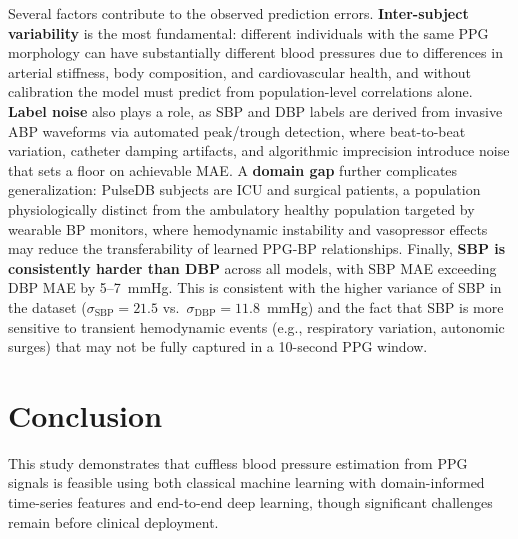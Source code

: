 \documentclass[11pt]{article}
\begin{document}
Several factors contribute to the observed prediction errors. \textbf{Inter-subject variability} is the most fundamental: different individuals with the same PPG morphology can have substantially different blood pressures due to differences in arterial stiffness, body composition, and cardiovascular health, and without calibration the model must predict from population-level correlations alone. \textbf{Label noise} also plays a role, as SBP and DBP labels are derived from invasive ABP waveforms via automated peak/trough detection, where beat-to-beat variation, catheter damping artifacts, and algorithmic imprecision introduce noise that sets a floor on achievable MAE. A \textbf{domain gap} further complicates generalization: PulseDB subjects are ICU and surgical patients, a population physiologically distinct from the ambulatory healthy population targeted by wearable BP monitors, where hemodynamic instability and vasopressor effects may reduce the transferability of learned PPG-BP relationships. Finally, \textbf{SBP is consistently harder than DBP} across all models, with SBP MAE exceeding DBP MAE by 5--7~mmHg. This is consistent with the higher variance of SBP in the dataset ($\sigma_{\text{SBP}} = 21.5$ vs.\ $\sigma_{\text{DBP}} = 11.8$~mmHg) and the fact that SBP is more sensitive to transient hemodynamic events (e.g., respiratory variation, autonomic surges) that may not be fully captured in a 10-second PPG window.

\section{Conclusion}

This study demonstrates that cuffless blood pressure estimation from PPG signals is feasible using both classical machine learning with domain-informed time-series features and end-to-end deep learning, though significant challenges remain before clinical deployment.
\end{document}
